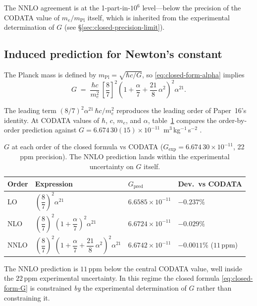 \documentclass[11pt]{article}
\newcommand{\mPl}{m_{\mathrm{Pl}}}
\begin{document}
\noindent
The NNLO agreement is at the 1-part-in-$10^6$ level---below the
precision of the CODATA value of $m_e/\mPl$ itself, which is
inherited from the experimental determination of $G$
(see \S\ref{sec:closed-precision-limit}).

\subsection{Induced prediction for Newton's constant}
\label{sec:closed-G}

The Planck mass is defined by $\mPl = \sqrt{\hbar c / G}$, so
\eqref{eq:closed-form-alpha} implies
\begin{equation}
  G
  \;=\;
  \frac{\hbar c}{m_e^2}\,
  \left[\frac{8}{7}\right]^2
  \left(1 + \frac{\alpha}{7} + \frac{21}{8}\,\alpha^2\right)^{\!2}
  \alpha^{21}.
  \label{eq:closed-form-G}
\end{equation}

\noindent
The leading term $\left(8/7\right)^2\alpha^{21}\,\hbar c/m_e^2$
reproduces the leading order of Paper~16's identity.  At CODATA values of $\hbar$, $c$,
$m_e$, and $\alpha$, table~\ref{tab:G-precision} compares the
order-by-order prediction against
$G = 6.674\,30(15)\times 10^{-11}$~m$^3$\,kg$^{-1}$\,s$^{-2}$
\cite{codata2018}.

\begin{table}[H]
\centering
\caption{$G$ at each order of the closed formula vs CODATA
  ($G_\text{exp} = 6.674\,30\times 10^{-11}$, 22\,ppm precision).
  The NNLO prediction lands within the experimental uncertainty
  on $G$ itself.}
\label{tab:G-precision}
\begin{tabular}{llll}
\toprule
Order & Expression & $G_\text{pred}$ & Dev.\ vs CODATA \\
\midrule
LO    & $\left(\dfrac{8}{7}\right)^{\!2}\alpha^{21}$
      & $6.6585\times 10^{-11}$
      & $-0.237\%$ \\[8pt]
NLO   & $\left(\dfrac{8}{7}\right)^{\!2}\!\left(1 + \dfrac{\alpha}{7}\right)^{\!2}\alpha^{21}$
      & $6.6724\times 10^{-11}$
      & $-0.029\%$ \\[8pt]
NNLO  & $\left(\dfrac{8}{7}\right)^{\!2}\!\left(1 + \dfrac{\alpha}{7} + \dfrac{21}{8}\,\alpha^2\right)^{\!2}\alpha^{21}$
      & $6.6742\times 10^{-11}$
      & $-0.0011\%$ \quad ($11$\,ppm) \\
\bottomrule
\end{tabular}
\end{table}

\noindent
The NNLO prediction is $11$\,ppm below the central CODATA value,
well inside the $22$\,ppm experimental uncertainty.  In this
regime the closed formula \eqref{eq:closed-form-G} is constrained
\emph{by} the experimental determination of $G$ rather than
constraining it.
\end{document}

